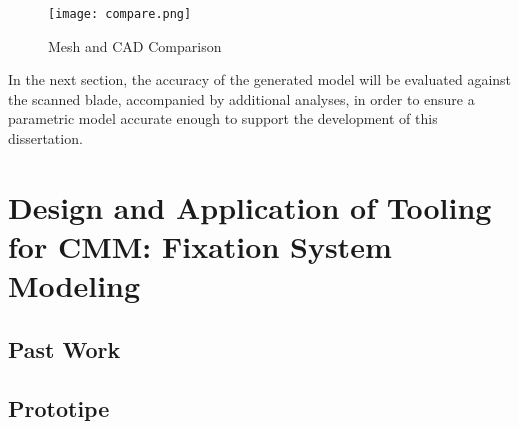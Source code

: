 \begin{figure}[H]
    \centering
    \texttt{[image: compare.png]}
    \caption{Mesh and CAD Comparison}
    \label{fig:compare.png}
\end{figure}

In the next section, the accuracy of the generated model will be evaluated against the scanned blade, accompanied by additional analyses, in order to ensure a parametric model accurate enough to support the development of this dissertation.

\chapter{Design and Application of Tooling for CMM: Fixation System Modeling}
\label{cha:dig}

\section{Past Work}
\label{sec:pastfix}

\section{Prototipe}
\label{sec:proto}








